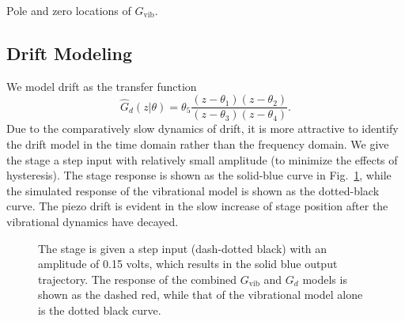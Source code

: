 \documentclass[twocolumn,twoside]{IEEEtran}
\newcommand{\Gv}{\ensuremath{G_{\text{vib}}}\xspace}
\begin{document}
\begin{table}
  \caption{Pole and zero locations of $G_{\textrm{vib}}$.}
  \label{tab:pzgvib}
  \begin{minipage}[T]{.6\linewidth}
    \small
    
\end{minipage}%
\begin{minipage}[T]{.3\linewidth}
  
\end{minipage}
\end{table}


\subsection{Drift Modeling}\label{sec:drift_model}
We model drift as the transfer function
\begin{equation}
\hat{G}_d(z|\theta) = \theta_5\frac{(z-\theta_1)(z-\theta_2)}{(z-\theta_3)(z-\theta_4)}.\nonumber
\end{equation}
Due to the comparatively slow dynamics of drift, it is more attractive to identify the drift model in the time domain rather than the frequency domain. 
We give the stage a step input with relatively small amplitude (to minimize the effects of hysteresis). The stage response is shown as the solid-blue curve in Fig.~\ref{fig:drift_fit}, while the simulated response of the vibrational model is shown as the dotted-black curve. The piezo drift is evident in the slow increase of stage position after the vibrational dynamics have decayed. 

\begin{figure}
  
  \caption{The stage is given a step input (dash-dotted black) with an amplitude of 0.15 volts, which results in the solid blue output trajectory. The response of the combined $\Gv$ and $G_{d}$ models is shown as the dashed red, while that of the vibrational model alone is the dotted black curve.}
  \label{fig:drift_fit}
\end{figure}
\end{document}
